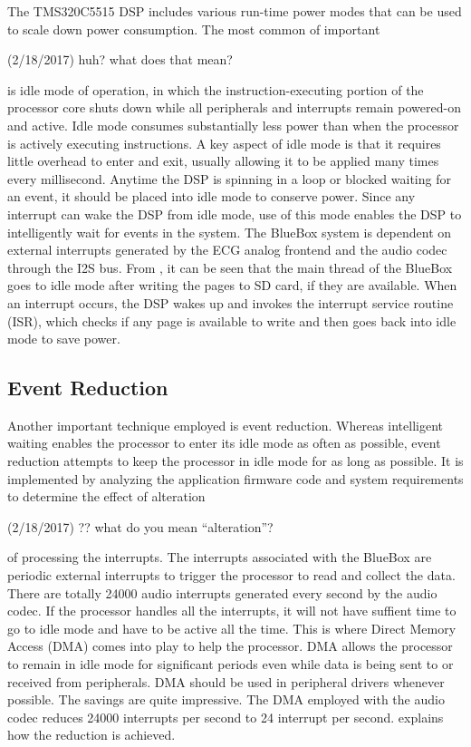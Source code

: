 The TMS320C5515 DSP includes various run-time power modes that can be
used to scale down power consumption. The most common of important
\begin{cmtPai}
	(2/18/2017) huh? what does that mean?
\end{cmtPai}
is idle mode of operation, in which the instruction-executing portion
of the processor core shuts down while all peripherals and interrupts
remain powered-on and active. Idle mode consumes substantially less
power than when the processor is actively executing instructions. A
key aspect of idle mode is that it requires little overhead to enter
and exit, usually allowing it to be applied many times every
millisecond.  Anytime the DSP is spinning in a loop or blocked
waiting for an event, it should be placed into idle mode to conserve
power. Since any interrupt can wake the DSP from idle mode, use of
this mode enables the DSP to intelligently wait for events in the
system. The BlueBox system is dependent on external interrupts
generated by the ECG analog frontend and the audio codec through the
I2S bus. From , it can be seen that the main thread of the
BlueBox goes to idle mode after writing the pages to SD card, if they
are available.  When an interrupt occurs, the DSP wakes up and
invokes the interrupt service routine (ISR), which checks if any page
is available to write and then goes back into idle mode to save
power. 


\subsection{Event Reduction}

Another important technique employed is event reduction.  Whereas
intelligent waiting enables the processor to enter its idle mode as
often as possible, event reduction attempts to keep the processor in
idle mode for as long as possible. It is implemented by analyzing the
application firmware code and system requirements to determine the
effect of alteration
\begin{cmtPai}
	(2/18/2017) ?? what do you mean ``alteration''?
\end{cmtPai}
of processing the interrupts. The interrupts associated with the
BlueBox are periodic external interrupts to trigger the processor to
read and collect the data. There are totally 24000 audio interrupts
generated every second by the audio codec. If the processor handles
all the interrupts, it will not have suffient time to go to idle mode
and have to be active all the time. This is where Direct Memory
Access (DMA) comes into play to help the processor.  DMA allows the
processor to remain in idle mode for significant periods even while
data is being sent to or received from peripherals. DMA should be
used in peripheral drivers whenever possible. The savings are quite
impressive. The DMA employed with the audio codec reduces 24000
interrupts per second to 24 interrupt per second.
 explains how the reduction is achieved.

